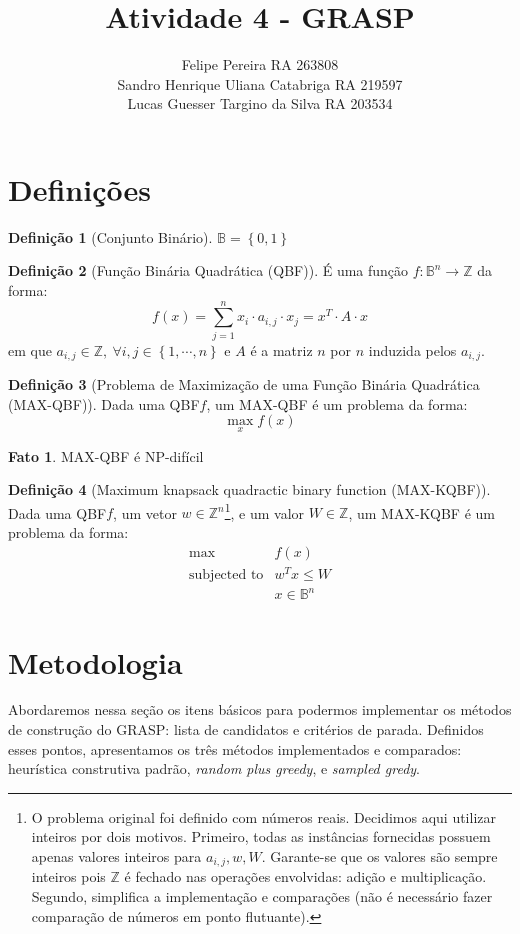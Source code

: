 \documentclass{article}
\title{Atividade 4 - GRASP}
\author{
    Felipe Pereira RA 263808 \\
    Sandro Henrique Uliana Catabriga RA 219597 \\
    Lucas Guesser Targino da Silva RA 203534
}
\theoremstyle{definition}
\newtheorem{defn}{Definição}
\newtheorem{fact}{Fato}
\newcommand{\Set}[1]{\left\{#1\right\}}
\newcommand{\Sum}[4]{\displaystyle\sum\limits_{#1 = #2}^{#3} #4}
\newcommand{\function}[3]{#1: #2 \rightarrow #3}
\newcommand{\transpose}[1]{#1^{T}}
\newcommand{\B}{\mathbb{B}}
\newcommand{\Bn}{\mathbb{B}^n}
\newcommand{\Z}{\mathbb{Z}}
\newcommand{\Zn}{\mathbb{Z}^n}
\newcommand{\qbf}{QBF\xspace}
\newcommand{\maxqbf}{MAX-QBF\xspace}
\newcommand{\maxkqbf}{MAX-KQBF\xspace}
\newcommand{\w}{w}
\newcommand{\W}{W}
\newcommand{\aij}{a_{i,j}}
\newcommand{\A}{A}
\begin{document}
\maketitle

\section{Definições}

\begin{defn}[Conjunto Binário]
    $\B = \Set{0, 1}$
\end{defn}

\begin{defn}[Função Binária Quadrática (\qbf)]
    É uma função $\function{f}{\Bn}{\Z}$ da forma:
    $$
        f(x)
        = \Sum{j}{1}{n}{x_i \cdot \aij \cdot x_j}
        = \transpose{x} \cdot \A \cdot x
    $$
    em que $\aij \in \Z, \ \forall i,j \in \Set{1, \cdots, n}$ e $\A$ é a matriz $n$ por $n$ induzida pelos $\aij$.
\end{defn}

\begin{defn}[Problema de Maximização de uma Função Binária Quadrática (\maxqbf)]
Dada uma \qbf $f$, um \maxqbf é um problema da forma:
$$
    \max\limits_{x} f(x)
$$
\end{defn}

\begin{fact}
\maxqbf é NP-difícil \cite{bib:max-qbf}
\end{fact}

\begin{defn}[Maximum knapsack quadractic binary function (\maxkqbf)]
Dada uma \qbf $f$, um vetor $\w \in \Zn$\footnote{O problema original foi definido com números reais. Decidimos aqui utilizar inteiros por dois motivos. Primeiro, todas as instâncias fornecidas possuem apenas valores inteiros para $\aij, \w, \W$. Garante-se que os valores são sempre inteiros pois $\Z$ é fechado nas operações envolvidas: adição e multiplicação. Segundo, simplifica a implementação e comparações (não é necessário fazer comparação de números em ponto flutuante).}, e um valor $\W \in \Z$, um \maxkqbf é um problema da forma:
\begin{eqnarray*}
    \max & f(x) \\
    \mbox{subjected to} & \transpose{\w} x \leq \W \\
    & x \in \Bn
\end{eqnarray*}
\end{defn}

\section{Metodologia}
Abordaremos nessa seção os itens básicos para podermos implementar os métodos de construção do GRASP: lista de candidatos e critérios de parada. Definidos esses pontos, apresentamos os três métodos implementados e comparados: heurística construtiva padrão, \textit{random plus greedy}, e \textit{sampled gredy}.
\end{document}
